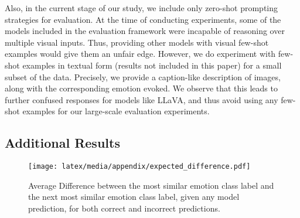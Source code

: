 Also, in the current stage of our study, we include only zero-shot prompting strategies for evaluation. At the time of conducting experiments, some of the models included in the evaluation framework were incapable of reasoning over multiple visual inputs. Thus, providing other models with visual few-shot examples would give them an unfair edge. However, we do experiment with few-shot examples in textual form (results not included in this paper) for a small subset of the data. Precisely, we provide a caption-like description of images, along with the corresponding emotion evoked. We observe that this leads to further confused responses for models like LLaVA, and thus avoid using any few-shot examples for our large-scale evaluation experiments.

\subsection{Additional Results}
\label{app:additional_results}

\begin{figure}[t]
    \centering
    \texttt{[image: latex/media/appendix/expected\_difference.pdf]}
    \caption{Average Difference between the most similar emotion class label and the next most similar emotion class label, given any model prediction, for both correct and incorrect predictions.}
    \label{fig:expected_diff_fine_grained}
\end{figure}

\begin{table*}[t]
    \centering
    \caption{Aggregated class-wise F1 scores for Simple Multimodal Classification. Model families include the F1 scores of each constituent model of different sizes (applicable for LLaVa and LLaVA-Next). The top-most F1 score achieved by each model family, across all fine-grained emotion classes, is highlighted in green, while the worst score is highlighted in red.}
    \label{tab:fine-grained-classwise-f1}
\end{table*}

